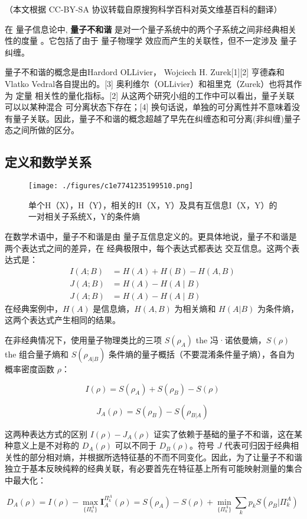 
（本文根据 CC-BY-SA 协议转载自原搜狗科学百科对英文维基百科的翻译）

在 量子信息论中, \textbf{量子不和谐} 是对一个量子系统中的两个子系统之间非经典相关性的度量 。它包括了由于 量子物理学 效应而产生的关联性，但不一定涉及 量子纠缠。

量子不和谐的概念是由Hardord OLLivier， Wojciech H. Zurek[1][2] 亨德森和 Vlatko Vedral各自提出的。[3] 奥利维尔（OLLivier）和祖里克（Zurek）也将其作为 定量 相关性的量化指标。[2] 从这两个研究小组的工作中可以看出，量子关联可以以某种混合 可分离状态下存在；[4] 换句话说，单独的可分离性并不意味着没有量子关联。因此，量子不和谐的概念超越了早先在纠缠态和可分离(非纠缠)量子态之间所做的区分。

\subsection{定义和数学关系}
\begin{figure}[ht]
\centering
\texttt{[image: ./figures/c1e7741235199510.png]}
\caption{单个H（X），H（Y），相关的H（X，Y）及具有互信息I（X，Y）的一对相关子系统X，Y的条件熵} \label{fig_LZBHX_1}
\end{figure}
在数学术语中，量子不和谐是由 量子互信息定义的。更具体地说，量子不和谐是两个表达式之间的差异，在 经典极限中，每个表达式都表达 交互信息。这两个表达式是：
\begin{equation}
\begin{aligned}
I(A; B) &= H(A) + H(B) - H(A, B) \\
J(A; B) &= H(A) - H(A \mid B) \\
J(A; B) &= H(A) - H(A \mid B)
\end{aligned}~
\end{equation}
在经典案例中，$H(A)$ 是信息熵，$H(A, B)$ 为相关熵和 $H(A|B)$ 为条件熵，这两个表达式产生相同的结果。

在非经典情况下，使用量子物理类比的三项 $S(\rho_A)$ the 冯·诺依曼熵，$S(\rho)$ the 组合量子熵和 $S(\rho_{A|B})$ 条件熵的量子概括（不要混淆条件量子熵），各自为概率密度函数 $\rho$：

$$I(\rho) = S(\rho_A) + S(\rho_B) - S(\rho)~$$

$$J_A(\rho) = S(\rho_B) - S(\rho_{B|A})~$$

这两种表达方式的区别 $I(\rho) - J_A(\rho)$ 证实了依赖于基础的量子不和谐，这在某种意义上是不对称的 $D_A(\rho)$ 可以不同于 $D_B(\rho)$。符号 $J$ 代表可归因于经典相关性的部分相对熵，并根据所选特征基的不而不同变化。因此，为了让量子不和谐独立于基本反映纯粹的经典关联，有必要首先在特征基上所有可能映射测量的集合中最大化：

$$D_A(\rho) = I(\rho) - \max_{\{\Pi^A_k\}} \mathbf{I}_A^{\Pi^A_k}(\rho) = S(\rho_A) - S(\rho) + \min_{\{\Pi^A_k\}} \sum_k p_k S(\rho_B|\Pi^A_k)~$$